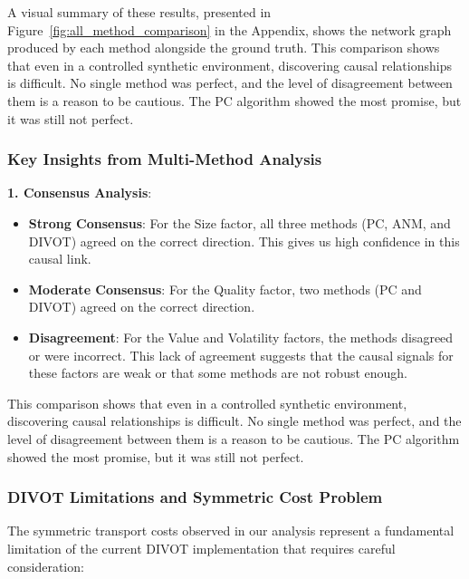A visual summary of these results, presented in Figure~\ref{fig:all_method_comparison} in the Appendix, shows the network graph produced by each method alongside the ground truth. This comparison shows that even in a controlled synthetic environment, discovering causal relationships is difficult. No single method was perfect, and the level of disagreement between them is a reason to be cautious. The PC algorithm showed the most promise, but it was still not perfect.

\subsubsection*{Key Insights from Multi-Method Analysis}

\textbf{1. Consensus Analysis}:
\begin{itemize}
    \item \textbf{Strong Consensus}: For the Size factor, all three methods (PC, ANM, and DIVOT) agreed on the correct direction. This gives us high confidence in this causal link.
    \item \textbf{Moderate Consensus}: For the Quality factor, two methods (PC and DIVOT) agreed on the correct direction.
    \item \textbf{Disagreement}: For the Value and Volatility factors, the methods disagreed or were incorrect. This lack of agreement suggests that the causal signals for these factors are weak or that some methods are not robust enough.
\end{itemize}

This comparison shows that even in a controlled synthetic environment, discovering causal relationships is difficult. No single method was perfect, and the level of disagreement between them is a reason to be cautious. The PC algorithm showed the most promise, but it was still not perfect.

\subsubsection{DIVOT Limitations and Symmetric Cost Problem}

The symmetric transport costs observed in our analysis represent a fundamental limitation of the current DIVOT implementation that requires careful consideration:

